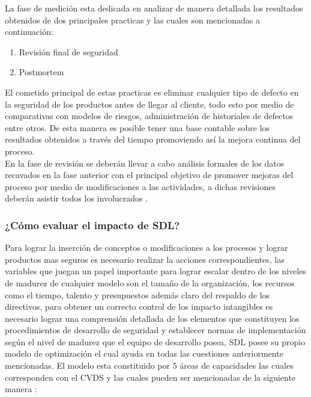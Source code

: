 \documentclass[runningheads,a4paper]{llncs}
\begin{document}
La fase de medición esta dedicada en analizar de manera detallada los resultados obtenidos de dos principales practicas y las cuales son mencionadas a continuación:

\begin{enumerate}
\item Revisión final de seguridad 
\item Postmortem 
\end{enumerate}

El cometido principal de estas practicas es eliminar cualquier tipo de defecto en la seguridad de los productos antes de llegar al cliente, todo esto por medio de comparativas con modelos de riesgos, administración de historiales de defectos entre otros. De esta manera es posible tener una base contable sobre los resultados obtenidos a través del tiempo promoviendo así la mejora continua del proceso. \\

En la fase de revisión se deberán llevar a cabo análisis formales de los datos recavados en la fase anterior con el principal objetivo de promover mejoras del proceso por medio de modificaciones a las actividades, a dichas revisiones deberán asistir todos los involucrados \cite{SDLWhitePaper}. 

\subsubsection{¿Cómo evaluar el impacto de \gls{SDL}?}

Para lograr la inserción de conceptos o modificaciones a los procesos y lograr productos mas seguros es necesario realizar la acciones correspondientes, las variables que juegan un papel importante para lograr escalar dentro de los niveles de madurez de cualquier modelo son el tamaño de la organización, los recursos como el tiempo, talento y presupuestos además claro del respaldo de los directivos,  para obtener un correcto control de los impacto intangibles es necesario lograr una comprensión detallada de los elementos que constituyen los procedimientos de desarrollo de seguridad y establecer normas de implementación según el nivel de madurez que el equipo de desarrollo posea, \gls{SDL} posee su propio modelo de optimización el cual ayuda en todas las cuestiones anteriormente mencionadas. El modelo esta constituido por 5 áreas de capacidades las cuales corresponden con el \gls{CVDS} y las cuales pueden ser  mencionadas de la siguiente manera \cite{SDLSecurityDevelopmentLifecicle}: 
\end{document}
